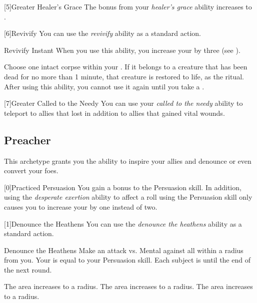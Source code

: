         [5]{Greater Healer's Grace} The bonus from your \textit{healer's grace} ability increases to .

        [6]{Revivify} You can use the \textit{revivify} ability as a standard action.
        \begin{instantability}{Revivify}
            Instant
            \rankline
            When you use this ability, you increase your  by three (see ).

            Choose one intact corpse within your .
            If it belongs to a creature that has been dead for no more than 1 minute, that creature is restored to life, as the  ritual.
            After using this ability, you cannot use it again until you take a .
        \end{instantability}

        [7]{Greater Called to the Needy} You can use your \textit{called to the needy} ability to teleport to allies that lost  in addition to allies that gained vital wounds.

    \newpage
    \subsection{Preacher}
        This archetype grants you the ability to inspire your allies and denounce or even convert your foes.

        [0]{Practiced Persuasion} You gain a  bonus to the Persuasion skill.
        In addition, using the \textit{desperate exertion} ability to affect a roll using the Persuasion skill only causes you to increase your  by one instead of two.

        [1]{Denounce the Heathens} You can use the \textit{denounce the heathens} ability as a standard action.
        \begin{instantability}{Denounce the Heathens}
            Make an attack vs. Mental against all  within a \medarea radius from you.
            Your  is equal to your Persuasion skill.
            \hit Each subject is \dazed until the end of the next round.

            \rankline
             The area increases to a \largearea radius.
             The area increases to a \hugearea radius.
             The area increases to a \gargarea radius.
        \end{instantability}

